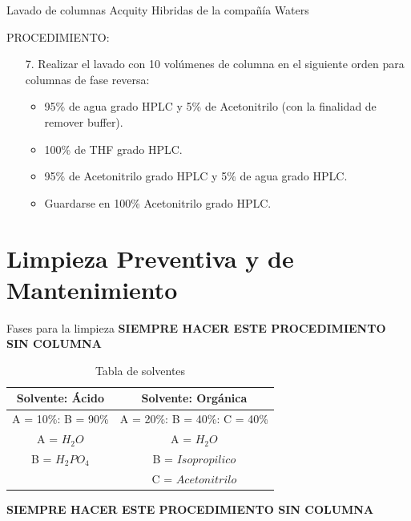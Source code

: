 \documentclass[11pt]{beamer}
\begin{document}
      \begin{frame}{Lavado de columnas Acquity Hibridas de la compañía  Waters}
          \begin{block}{PROCEDIMIENTO:}
              \begin{enumerate}

                  \item[7.] Realizar el lavado con 10 volúmenes de columna en el siguiente orden para columnas de fase reversa:
                  \begin{itemize}
                      \item 95\% de agua grado HPLC y 5\% de Acetonitrilo (con la finalidad de remover buffer).
                      \item 100\% de THF grado HPLC.
                      \item 95\% de Acetonitrilo grado HPLC y 5\% de agua grado HPLC.
                      \item Guardarse en 100\% Acetonitrilo grado HPLC.
                  \end{itemize}

              \end{enumerate}
          \end{block}
      \end{frame}
    \section{Limpieza Preventiva y de Mantenimiento}
      \begin{frame}{Fases para la limpieza}
          \textbf{{\Large }SIEMPRE HACER ESTE PROCEDIMIENTO SIN COLUMNA}
          \begin{table}[!h]
              \centering
              \caption{Tabla de solventes}
              \label{tab:tablasolvente}
              \begin{tabular}{c|c}
                  Solvente: Ácido & Solvente: Orgánica \\
                  \hline
                  A = 10\%: B = 90\%  & A = 20\%: B = 40\%: C = 40\%  \\
                  \hline
                  A = $H_2O$    & A = $H_2O$  \\
                  B = $H_2PO_4$ & B = $Isopropilico$  \\
                  & C = $Acetonitrilo$ \\
                  \hline
              \end{tabular}
          \end{table}

          \textbf{{\Large }SIEMPRE HACER ESTE PROCEDIMIENTO SIN COLUMNA}
      \end{frame}
\end{document}
